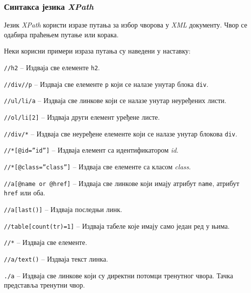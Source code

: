 \documentclass[12pt,oneside]{memoir}
\begin{document}
\subsubsection{Синтакса језика \textit{XPath}}
Језик \textit{XPath} користи изразе путања за избор чворова у \textit{XML} документу. Чвор се одабира праћењем путање или корака. 

Неки корисни примери израза путања су наведени у наставку:
\begin{description}
\item \texttt{//h2} -- Издваја све елементе \texttt{h2}.
\item \texttt{//div//p} -- Издваја све елементе \texttt{p} који се налазе унутар блока \texttt{div}.
\item \texttt{//ul/li/a} -- Издваја све линкове који се налазе унутар неуређених листи.
\item \texttt{//ol/li[2]} -- Издваја други елемент уређене листе.
\item \texttt{//div/*} -- Издваја све неуређене елементе који се налазе унутар блокова \texttt{div}.
\item \texttt{//*[@id=''id'']} -- Издваја елемент са идентификатором \textit{id}.
\item \texttt{//*[@class=''class'']} -- Издваја све елементе са класом \textit{class}.
\item \texttt{//a[@name or @href]} -- Издваја све линкове који имају атрибут \texttt{name}, атрибут \texttt{href} или оба.
\item \texttt{//a[last()]} -- Издваја последњи линк.
\item \texttt{//table[count(tr)=1]} -- Издваја табеле које имају само један ред у њима.
\item \texttt{//*} -- Издваја све елементе.
\item \texttt{//a/text()} -- Издваја текст линка.
\item \texttt{./a} -- Издваја све линкове који су директни потомци тренутног чвора. Тачка представља тренутни чвор.
\end{description}
\end{document}
